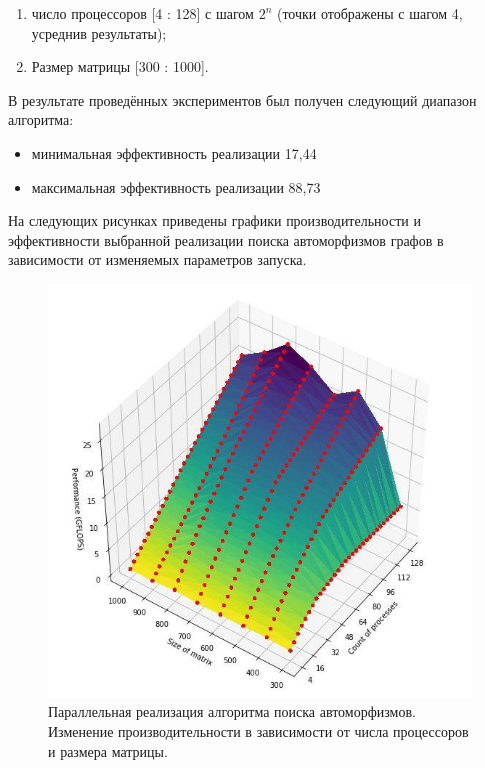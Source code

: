 \begin{enumerate}
\item число процессоров [4 : 128] с шагом $ 2^n$ (точки отображены с шагом 4, усреднив результаты);
\item Размер матрицы [300 : 1000].
\end{enumerate}

В результате проведённых экспериментов был получен следующий диапазон алгоритма:

\begin{itemize}
\item минимальная эффективность реализации 17,44%
\item максимальная эффективность реализации 88,73%
\end{itemize}

На следующих рисунках приведены графики производительности и эффективности выбранной реализации поиска автоморфизмов графов в зависимости от изменяемых параметров запуска.

\begin{figure}[ht]
\centering 
    \includegraphics[scale=0.8]{image/p.jpg}
    \caption{Параллельная реализация алгоритма поиска автоморфизмов. Изменение производительности в зависимости от числа процессоров и размера матрицы.}
    \label{srg}
\end{figure}

